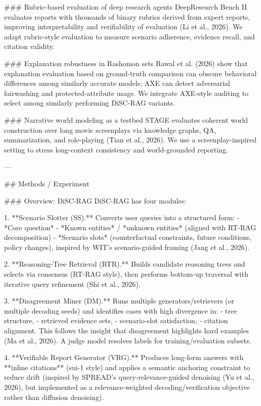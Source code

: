 ### Rubric-based evaluation of deep research agents  
DeepResearch Bench II evaluates reports with thousands of binary rubrics derived from expert reports, improving interpretability and verifiability of evaluation (Li et al., 2026). We adapt rubric-style evaluation to measure scenario adherence, evidence recall, and citation validity.

### Explanation robustness in Rashomon sets  
Rawal et al. (2026) show that explanation evaluation based on ground-truth comparison can obscure behavioral differences among similarly accurate models; AXE can detect adversarial fairwashing and protected-attribute usage. We integrate AXE-style auditing to select among similarly performing DiSC-RAG variants.

### Narrative world modeling as a testbed  
STAGE evaluates coherent world construction over long movie screenplays via knowledge graphs, QA, summarization, and role-playing (Tian et al., 2026). We use a screenplay-inspired setting to stress long-context consistency and world-grounded reporting.

---

## Methods / Experiment  

### Overview: DiSC-RAG  
DiSC-RAG has four modules:

1. **Scenario Slotter (SS).** Converts user queries into a structured form:  
   - *Core question*  
   - *Known entities* / *unknown entities* (aligned with RT-RAG decomposition)  
   - *Scenario slots* (counterfactual constraints, future conditions, policy changes), inspired by WIT’s scenario-guided framing (Jang et al., 2026).

2. **Reasoning-Tree Retrieval (RTR).** Builds candidate reasoning trees and selects via consensus (RT-RAG style), then performs bottom-up traversal with iterative query refinement (Shi et al., 2026).

3. **Disagreement Miner (DM).** Runs multiple generators/retrievers (or multiple decoding seeds) and identifies cases with high divergence in:
   - tree structure,
   - retrieved evidence sets,
   - scenario-slot satisfaction,
   - citation alignment.
   This follows the insight that disagreement highlights hard examples (Ma et al., 2026). A judge model resolves labels for training/evaluation subsets.

4. **Verifiable Report Generator (VRG).** Produces long-form answers with **inline citations** (sui-1 style) and applies a semantic anchoring constraint to reduce drift (inspired by SPREAD’s query-relevance-guided denoising (Yu et al., 2026), but implemented as a relevance-weighted decoding/verification objective rather than diffusion denoising).

